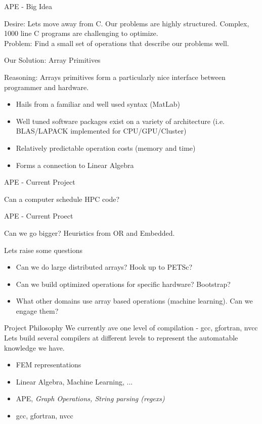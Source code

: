 \documentclass[compress, blue]{beamer}
\begin{document}
\begin{frame}{APE - Big Idea}

Desire: Lets move away from C. Our problems are highly structured. Complex, 1000 line C programs are challenging to optimize.\\

Problem: Find a small set of operations that describe our problems well.

Our Solution: Array Primitives 

Reasoning: Arrays primitives form a particularly nice interface between
programmer and hardware. 
\begin{itemize}
\item Hails from a familiar and well used syntax (MatLab)
\item Well tuned software packages exist on a variety of architecture (i.e.
BLAS/LAPACK implemented for CPU/GPU/Cluster) 
\item Relatively predictable operation costs (memory and time) 
\item Forms a connection to Linear Algebra
\end{itemize}

\end{frame}

\begin{frame}{APE - Current Project} 

Can a computer schedule HPC code?

\end{frame}

\begin{frame}{APE - Current Proect} 

Can we go bigger? Heuristics from OR and Embedded. 

Lets raise some questions
\begin{itemize}
\item Can we do large distributed arrays? Hook up to PETSc?
\item Can we build optimized operations for specific hardware? Bootstrap?
\item What other domains use array based operations (machine learning). Can we
engage them?
\end{itemize}
\end{frame}

\begin{frame}{Project Philosophy}
We currently ave one level of compilation - gcc, gfortran, nvcc
Lets build several compilers at different levels to represent the automatable
knowledge we have. 

\begin{itemize}
\item FEM representations
\item Linear Algebra, Machine Learning, ...
\item APE, \textit{Graph Operations, String parsing (regexs)}
\item gcc, gfortran, nvcc
\end{itemize}

\end{frame}
\end{document}
